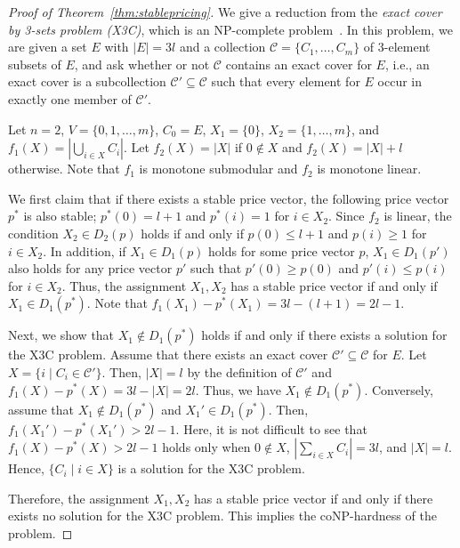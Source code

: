 \documentclass[letterpaper]{article}
\theoremstyle{definition}
\begin{document}
\begin{proof}[Proof of Theorem~\ref{thm:stablepricing}]
  We give a reduction from the \emph{exact cover by 3-sets problem (X3C)}, which is an NP-complete problem~\cite{garey1979computers}.
  In this problem, we are given a set $E$ with $|E|=3l$ and a collection $\mathcal{C}=\{C_1,\dots,C_m\}$ of 3-element subsets of $E$,
  and ask whether or not $\mathcal{C}$ contains an exact cover for $E$, i.e., an exact cover is 
  a subcollection $\mathcal{C}'\subseteq \mathcal{C}$ such that every element for $E$ occur in exactly one member of $\mathcal{C}'$.

  Let $n=2$, $V=\{0,1,\dots,m\}$, $C_0=E$,
  $X_1=\{0\}$, $X_2=\{1,\dots,m\}$, and $f_1(X)=|\bigcup_{i\in X}C_i|$.
  Let $f_2(X)=|X|$ if $0\not\in X$ and $f_2(X)=|X|+l$ otherwise.
  Note that $f_1$ is monotone submodular and $f_2$ is monotone linear.

  We first claim that if there exists a stable price vector,
  the following price vector $p^*$ is also stable; $p^*(0)=l+1$ and $p^*(i)=1$ for $i\in X_2$.
  Since $f_2$ is linear, the condition \(X_2\in D_2(p)\) holds if and only if $p(0)\le l+1$ and $p(i)\ge 1$ for $i\in X_2$.
  In addition, if \(X_1\in D_1(p)\) holds for some price vector $p$,
  \(X_1\in D_1(p')\) also holds for any price vector \(p'\) such that $p'(0)\ge p(0)$ and $p'(i)\le p(i)$ for $i\in X_2$.
  Thus, the assignment $X_1,X_2$ has a stable price vector if and only if \(X_1\in D_1(p^*)\).
  Note that \(f_1(X_1)-p^*(X_1)=3l-(l+1)=2l-1\).

  Next, we show that \(X_1\not\in D_1(p^*)\) holds if and only if 
  there exists a solution for the X3C problem.
  Assume that there exists an exact cover $\mathcal{C}'\subseteq \mathcal{C}$ for $E$.
  Let \(X=\{i\mid C_i\in\mathcal{C}'\}\).
  Then, \(|X|=l\) by the definition of \(\mathcal{C}'\) and \(f_1(X)-p^*(X)=3l-|X|=2l\).
  Thus, we have \(X_1\not\in D_1(p^*)\).
  Conversely, assume that \(X_1\not\in D_1(p^*)\) and \(X_1'\in D_1(p^*)\).
  Then, \(f_1(X_1')-p^*(X_1')>2l-1\).
  Here, it is not difficult to see that \(f_1(X)-p^*(X)>2l-1\) holds only when \(0\not\in X\), \(|\sum_{i\in X}C_i|=3l\), and \(|X|=l\).
  Hence, \(\{C_i\mid i\in X\}\) is a solution for the X3C problem.

  Therefore, the assignment $X_1,X_2$ has a stable price vector
  if and only if there exists no solution for
  the X3C problem.
  This implies the coNP-hardness of the problem.  
\end{proof}
\end{document}
